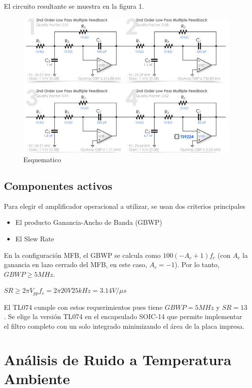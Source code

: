 \documentclass[12pt,a4paper]{article}
\begin{document}
El circuito resultante se muestra en la figura 1.

\begin{figure}[H]
\centering
\includegraphics[width=\textwidth]{img/filtro1.png}
\caption{Esquematico}
\end{figure}

\subsection{Componentes activos}

Para elegir el amplificador operacional a utilizar, se usan dos criterios principales\cite{opAmp}\cite{Rules} 

\begin{itemize}
\item El producto Ganancia-Ancho de Banda (GBWP)
\item El Slew Rate
\end{itemize}

En la configuración MFB, el GBWP se calcula como $100(-A_c+1)f_c$ (con $A_c$ la ganancia en lazo cerrado del MFB, en este caso, $A_c=-1$). Por lo tanto, $GBWP \geq 5MHz$.

$SR \geq 2\pi V_{pp}f_c = 2\pi 20V 25kHz = 3.14V/\mu s$

El TL074 cumple con estos requerimientos pues tiene $GBWP=5MHz$ y $SR=13$. Se elige la versión TL074 en el encapsulado SOIC-14 que permite implementar el filtro completo con un solo integrado minimizando el área de la placa impresa. 

\section{Análisis de Ruido a Temperatura Ambiente\cite{Noise}}
\end{document}
